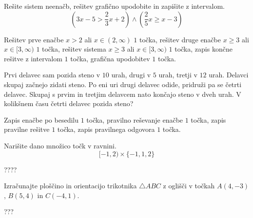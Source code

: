 \documentclass[addpoints]{exam}
\begin{document}
\begin{questions}
    



    \newpage 

    
    \question[5]
    Rešite sistem neenačb, rešitev grafično upodobite in zapišite z intervalom.
    $$ \left(3x-5>\frac{2}{3}x+2\right)\land\left(\frac{2}{5}x\geq x-3\right) $$
    
    
    \begin{solution}[10cm]
        Rešitev prve enačbe $x>2$ ali $x\in(2,\infty)$ $1$ točka, rešitev druge enačbe $x\geq 3$ ali $x\in[3,\infty)$ $1$ točka, rešitev sistema $x\geq 3$ ali $x\in[3,\infty)$ $1$ točka, zapis končne rešitve z intervalom $1$ točka, grafična upodobitev $1$ točka.
    \end{solution}





    \question[5]
    Prvi delavec sam pozida steno v $10$ urah, drugi v $5$ urah, tretji v $12$ urah. Delavci
    skupaj začnejo zidati steno. Po eni uri drugi delavec odide, pridruži pa se četrti delavec.
    Skupaj s prvim in tretjim delavcem nato končajo steno v dveh urah. V kolikšnem času četrti delavec
    pozida steno?
    
    
    \begin{solution}[9cm]
        
        Zapis enačbe po besedilu $1$ točka, pravilno reševanje enačbe $1$ točka, zapis pravilne rešitve $1$ točka, zapis pravilnega odgovora $1$ točka.
    \end{solution}




        
\newpage


    \question[4]
    Narišite dano množico točk v ravnini.
        $$[-1,2)\times \{-1,1,2\}$$

            \begin{solution}[9cm]
                ????
            \end{solution}

    
    

    \question[4]
    Izračunajte ploščino in orientacijo trikotnika $\triangle ABC$ z oglišči v točkah $A(4,-3)$, $B(5,4)$ in $C(-4,1)$.
    
    
    \begin{solution}[6cm]
        ???
    \end{solution}


\end{questions}
\end{document}
